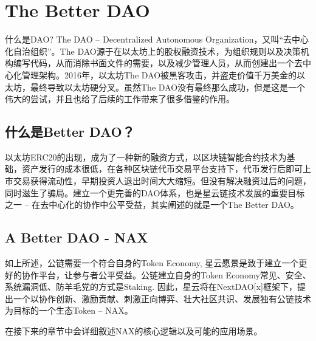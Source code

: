\section{The Better DAO}
什么是DAO? The DAO -- Decentralized Autonomous Organization，又叫“去中心化自治组织”。The DAO源于在以太坊上的股权融资技术，为组织规则以及决策机构编写代码，从而消除书面文件的需要，以及减少管理人员，从而创建出一个去中心化管理架构。2016年，以太坊The DAO被黑客攻击，并盗走价值千万美金的以太坊，最终导致以太坊硬分叉。虽然The DAO没有最终那么成功，但是这是一个伟大的尝试，并且也给了后续的工作带来了很多借鉴的作用。

\subsection{什么是Better DAO？}
以太坊ERC20的出现，成为了一种新的融资方式，以区块链智能合约技术为基础，资产发行的成本很低，在各种区块链代币交易平台支持下，代币发行后即可上市交易获得流动性，早期投资人退出时间大大缩短。但没有解决融资过后的问题，同时滋生了骗局。建立一个更完善的DAO体系，也是星云链技术发展的重要目标之一 -- 在去中心化的协作中公平受益，其实阐述的就是一个The Better DAO。

\subsection{A Better DAO - NAX}
如上所述，公链需要一个符合自身的Token Economy, 星云愿景是致于建立一个更好的协作平台，让参与者公平受益。公链建立自身的Token Economy常见、安全、系统漏洞低、防羊毛党的方式是Staking. 因此，星云将在NextDAO[x]框架下，提出一个以协作创新、激励贡献、刺激正向博弈、壮大社区共识、发展独有公链技术为目标的一个生态Token -- NAX。

在接下来的章节中会详细叙述NAX的核心逻辑以及可能的应用场景。